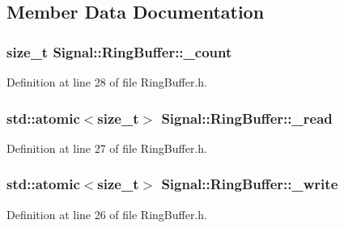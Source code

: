 \subsection{Member Data Documentation}
\hypertarget{class_signal_1_1_ring_buffer_ab41dbb1bd8c572099349f92055ed9185}{
\subsubsection[{\+\_\+count}]{\setlength{\rightskip}{0pt plus 5cm}size\+\_\+t Signal\+::\+Ring\+Buffer\+::\+\_\+count\hspace{0.3cm}{\ttfamily [protected]}}}\label{class_signal_1_1_ring_buffer_ab41dbb1bd8c572099349f92055ed9185}


Definition at line 28 of file Ring\+Buffer.\+h.

\hypertarget{class_signal_1_1_ring_buffer_a4bdf5d626567f423b480398aef2e8bb0}{
\subsubsection[{\+\_\+read}]{\setlength{\rightskip}{0pt plus 5cm}std\+::atomic$<$size\+\_\+t$>$ Signal\+::\+Ring\+Buffer\+::\+\_\+read\hspace{0.3cm}{\ttfamily [protected]}}}\label{class_signal_1_1_ring_buffer_a4bdf5d626567f423b480398aef2e8bb0}


Definition at line 27 of file Ring\+Buffer.\+h.

\hypertarget{class_signal_1_1_ring_buffer_a121cbb3679c61132fad237c671d08bef}{
\subsubsection[{\+\_\+write}]{\setlength{\rightskip}{0pt plus 5cm}std\+::atomic$<$size\+\_\+t$>$ Signal\+::\+Ring\+Buffer\+::\+\_\+write\hspace{0.3cm}{\ttfamily [protected]}}}\label{class_signal_1_1_ring_buffer_a121cbb3679c61132fad237c671d08bef}


Definition at line 26 of file Ring\+Buffer.\+h.

